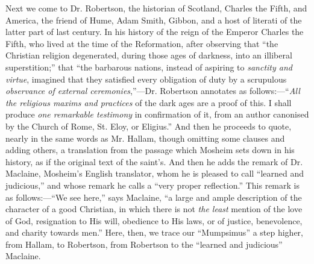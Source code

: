 Next we come to Dr. Robertson, the historian of
Scotland, Charles the Fifth, and America, the friend of
Hume, Adam Smith, Gibbon, and a host of literati of the
latter part of last century. In his history of the reign
of the Emperor Charles the Fifth, who lived at the time
of the Reformation, after observing that ``the
Christian religion degenerated, during those ages of
darkness, into an illiberal superstition;'' that
``the barbarous nations, instead of aspiring to \emph{sanctity
and virtue}, imagined that they satisfied every
obligation of duty by a scrupulous \emph{observance of
external ceremonies},''—Dr. Robertson
annotates as follows:—``\emph{All the religious
maxims and practices} of the dark ages are a proof of
this. I shall produce \emph{one remarkable testimony}
in confirmation of it, from an author canonised by the
Church of Rome, St. Eloy, or Eligius.'' And then he
proceeds to quote, nearly in the same words as Mr.
Hallam, though omitting some clauses and adding others, a
translation from the passage which Mosheim sets down in
his history, as if the original text of the saint's. And
then he adds the remark of Dr. Maclaine, Mosheim's
English translator, whom he is pleased to call
``learned and judicious,'' and whose remark he
calls a ``very proper reflection.'' This remark
is as follows:—``We see here,'' says
Maclaine, ``a large and ample description of the
character of a good Christian, in which there is not \emph{the
least} mention of the love of God, resignation to His
will, obedience to His laws, or of justice, benevolence,
and charity towards men.'' Here, then, we trace our
``Mumpsimus'' a step higher, from Hallam, to
Robertson, from Robertson to the ``learned and
judicious'' Maclaine.

